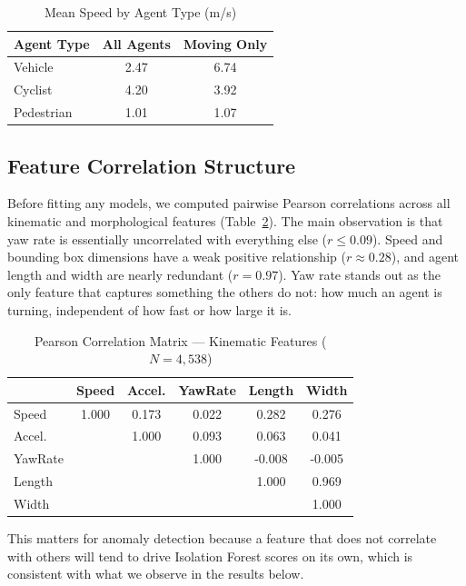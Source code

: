 \documentclass[conference]{IEEEtran}
\begin{document}
\begin{table}[h]
\centering
\caption{Mean Speed by Agent Type (m/s)}
\label{tab:speeds}
\begin{tabular}{lcc}
\toprule
Agent Type & All Agents & Moving Only \\
\midrule
Vehicle    & 2.47       & 6.74        \\
Cyclist    & 4.20       & 3.92        \\
Pedestrian & 1.01       & 1.07        \\
\bottomrule
\end{tabular}
\end{table}

\subsection{Feature Correlation Structure}

Before fitting any models, we computed pairwise Pearson correlations across all kinematic and morphological features (Table~\ref{tab:corr}). The main observation is that yaw rate is essentially uncorrelated with everything else ($r \leq 0.09$). Speed and bounding box dimensions have a weak positive relationship ($r \approx 0.28$), and agent length and width are nearly redundant ($r = 0.97$). Yaw rate stands out as the only feature that captures something the others do not: how much an agent is turning, independent of how fast or how large it is.

\begin{table}[h]
\centering
\caption{Pearson Correlation Matrix — Kinematic Features ($N = 4{,}538$)}
\label{tab:corr}
\begin{tabular}{lccccc}
\toprule
 & Speed & Accel. & YawRate & Length & Width \\
\midrule
Speed    & 1.000 & 0.173 & 0.022 & 0.282 & 0.276 \\
Accel.   &       & 1.000 & 0.093 & 0.063 & 0.041 \\
YawRate  &       &       & 1.000 & -0.008 & -0.005 \\
Length   &       &       &       & 1.000 & 0.969 \\
Width    &       &       &       &       & 1.000 \\
\bottomrule
\end{tabular}
\end{table}

This matters for anomaly detection because a feature that does not correlate with others will tend to drive Isolation Forest scores on its own, which is consistent with what we observe in the results below.
\end{document}
